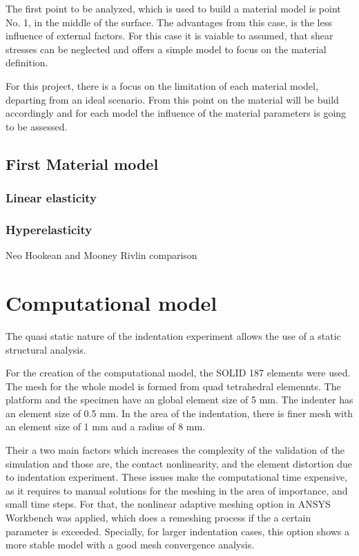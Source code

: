 The first point to be analyzed, which is used to build a material model is point No. 1,
in the middle of the surface. The advantages from this case, is the less influence of
external factors. For this case it is vaiable to assumed, that shear stresses can be 
neglected and offers a simple model to focus on the material definition.

For this project, there is a focus on the limitation of each material model, 
departing from an ideal scenario. From this point on the material will be build 
accordingly and for each model the influence of the material parameters is going
to be assessed.

\subsection{First Material model}

\subsubsection{Linear elasticity}


\subsubsection{Hyperelasticity}

Neo Hookean and Mooney Rivlin comparison


\section{Computational model}
The quasi static nature of the indentation experiment allows the use of a static 
structural analysis.

For the creation of the computational model, the SOLID 187 elements were used. The mesh 
for the whole model is formed from quad tetrahedral elemennts. The platform and 
the specimen have an global element size of 5 mm. The indenter has an element size of
0.5 mm. In the area of the indentation, there is finer mesh with an element size of
1 mm and a radius of 8 mm. 

Their a two main factors which increases the complexity of the validation of the simulation
and those are, the contact nonlinearity, and the element distortion due to indentation
 experiment. These issues make the computational time expensive, as it requires to manual 
 solutions for the meshing in the area of importance, and small time steps. 
 For that, 
 the nonlinear adaptive meshing option in ANSYS Workbench was applied, which does a remeshing
 process if the a certain parameter is exceeded.%
Specially, for larger indentation cases, this option shows a more stable model with a 
good mesh convergence analysis.

